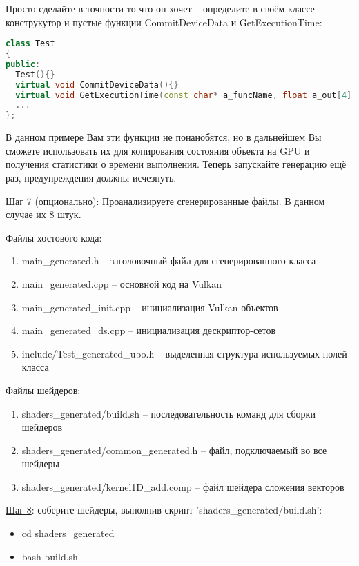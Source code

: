 \documentclass[11pt,fleqn,english,russian]{report} %
\begin{document}
Просто сделайте в точности то что он хочет -- определите в своём классе конструкутор и пустые функции CommitDeviceData и GetExecutionTime:

\begin{lstlisting}[language=C++, caption=работаем с указателем на экземпляр класса]
class Test 
{	
public:
  Test(){}
  virtual void CommitDeviceData(){}
  virtual void GetExecutionTime(const char* a_funcName, float a_out[4]){}
  ...	
};
\end{lstlisting}\label{lst:define_empty_func}

В данном примере Вам эти функции не понанобятся, но в дальнейшем Вы сможете использовать их для копирования состояния объекта на GPU и получения статистики о времени выполнения. Теперь запускайте генерацию ещё раз, предупреждения должны исчезнуть.

\vspace*{5px}
\underline{Шаг 7 (опционально)}:  Проанализируете сгенерированные файлы. В данном случае их 8 штук.

\vspace*{5px}
Файлы хостового кода:
\begin{enumerate}
\item main\_generated.h -- заголовочный файл для сгенерированного класса
\item main\_generated.cpp -- основной код на Vulkan
\item main\_generated\_init.cpp -- инициализация Vulkan-объектов
\item main\_generated\_ds.cpp -- инициализация дескриптор-сетов
\item include/Test\_generated\_ubo.h -- выделенная структура используемых полей класса
\end{enumerate}

\vspace*{5px}
Файлы шейдеров:
\begin{enumerate}
\item shaders\_generated/build.sh -- последовательность команд для сборки шейдеров	
\item shaders\_generated/common\_generated.h -- файл, подключаемый во все шейдеры
\item shaders\_generated/kernel1D\_add.comp -- файл шейдера сложения векторов
\end{enumerate}	

\vspace*{5px}
\underline{Шаг 8}: соберите шейдеры, выполнив скрипт 'shaders\_generated/build.sh':
\begin{itemize}
	\item cd shaders\_generated
	\item bash build.sh
\end{itemize}
\end{document}
